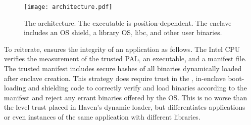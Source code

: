 

\begin{figure}[t!]
\centering
\texttt{[image: architecture.pdf]}
\caption{The \graphenesgx{} architecture. The executable is position-dependent.
The enclave includes an OS shield, a library OS, libc, and other user binaries.
}
\label{fig:sgx:arch}
\end{figure}


To reiterate, \graphenesgx{} ensures the integrity of an application as follows.
The Intel CPU verifies
the measurement of the \graphenesgx{} trusted PAL, an executable,
and a manifest file.
The trusted manifest includes secure hashes of all binaries dynamically loaded after enclave creation. %
This strategy does require
trust in the \graphenesgx{}, in-enclave boot-loading and shielding code to correctly verify and load binaries
according to the manifest and reject any errant binaries offered by the OS.  This is no worse than the level trust
placed in Haven's dynamic loader, but differentiates applications or even instances of the same application with different libraries.





